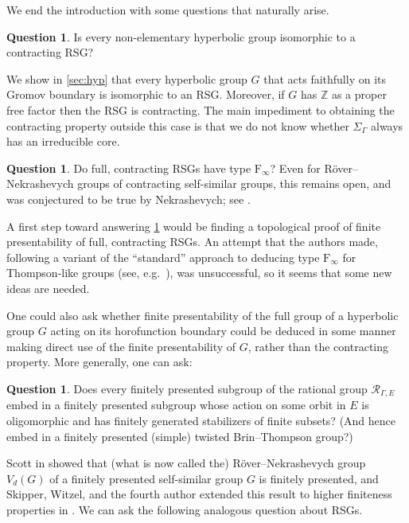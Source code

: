 \documentclass[11pt,letterpaper]{amsart}
\theoremstyle{definition}
\newtheorem{question}[theorem]{Question}
\newcommand{\Z}{\mathbb{Z}}
\newcommand{\R}{\mathcal{R}}
\newcommand{\F}{\mathrm{F}}
\begin{document}
We end the introduction with some questions that naturally arise.

\setcounter{theorem}{0}
\begin{question}
Is every non-elementary hyperbolic group isomorphic to a contracting RSG?\end{question}

We show in \cref{sec:hyp} that every hyperbolic group $G$ that acts faithfully on its Gromov boundary is isomorphic to an RSG. Moreover, if $G$ has $\Z$ as a proper free factor then the RSG is contracting. The main impediment to obtaining the contracting property outside this case is that we do not know whether $\Sigma_\Gamma$ always has an irreducible core.

\begin{question}\label{quest:F_infty}
Do full, contracting RSGs have type $\F_{\!\infty}$? Even for R\"over--Nekrashevych groups of contracting self-similar groups, this remains open, and was conjectured to be true by Nekrashevych; see \cite{NekraFP}.
\end{question}

A first step toward answering \cref{quest:F_infty} would be finding a topological proof of finite presentability of full, contracting RSGs. An attempt that the authors made, following a variant of the ``standard'' approach to deducing type $\F_{\!\infty}$ for Thompson-like groups (see, e.g.\ \cite{BelkMatucci,ZaremskyF}), was unsuccessful, so it seems that some new ideas are needed.

One could also ask whether finite presentability of the full group of a hyperbolic group $G$ acting on its horofunction boundary could be deduced in some manner making direct use of the finite presentability of $G$, rather than the contracting property. More generally, one can ask:

\begin{question}\label{quest:all_fp_subgroups_of_rat}
Does every finitely presented subgroup of the rational group $\R_{\Gamma,E}$ embed in a finitely presented subgroup whose action on some orbit in $E$ is oligomorphic and has finitely generated stabilizers of finite subsets? (And hence embed in a finitely presented (simple) twisted Brin--Thompson group?)
\end{question}

Scott in \cite[Theorem~2]{scott84} showed that (what is now called the) R\"over--Nekrashevych group $V_d(G)$ of a finitely presented self-similar group $G$ is finitely presented, and Skipper, Witzel, and the fourth author extended this result to higher finiteness properties in \cite[Theorem~4.15]{SWZ}.  We can ask the following analogous question about RSGs.
\end{document}
